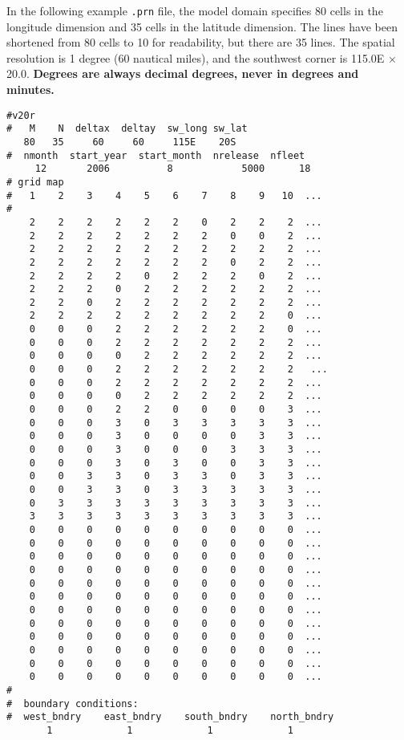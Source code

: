 \begin{description}
In the following example {\tt .prn} file, the model domain specifies
80 cells in the longitude dimension and 35 cells in the latitude
dimension. The lines have been shortened from 80 cells to 10 for
readability, but there are 35 lines. The spatial resolution is 1
degree (60 nautical miles), and the southwest corner is 115.0{E}
$\times$
20.0. {\bf Degrees are always decimal degrees, never in
degrees and minutes.}
{\par{}\normalbaselineskip
\begin{verbatim}
#v20r
#   M    N  deltax  deltay  sw_long sw_lat
   80   35     60     60     115E    20S
#  nmonth  start_year  start_month  nrelease  nfleet
     12       2006          8            5000      18
# grid map
#   1    2    3    4    5    6    7    8    9   10  ...
#
    2    2    2    2    2    2    0    2    2    2  ...
    2    2    2    2    2    2    2    0    0    2  ...
    2    2    2    2    2    2    2    2    2    2  ...
    2    2    2    2    2    2    2    0    2    2  ...
    2    2    2    2    0    2    2    2    0    2  ...
    2    2    2    0    2    2    2    2    2    2  ...
    2    2    0    2    2    2    2    2    2    2  ...
    2    2    2    2    2    2    2    2    2    0  ...
    0    0    0    2    2    2    2    2    2    0  ...
    0    0    0    2    2    2    2    2    2    2  ...
    0    0    0    0    2    2    2    2    2    2  ...
    0    0    0    2    2    2    2    2    2    2   ...
    0    0    0    2    2    2    2    2    2    2  ...
    0    0    0    0    2    2    2    2    2    2  ...
    0    0    0    2    2    0    0    0    0    3  ...
    0    0    0    3    0    3    3    3    3    3  ...
    0    0    0    3    0    0    0    0    3    3  ...
    0    0    0    3    0    0    0    3    3    3  ...
    0    0    0    3    0    3    0    0    3    3  ...
    0    0    3    3    0    3    3    0    3    3  ...
    0    0    3    3    0    3    3    3    3    3  ...
    0    3    3    3    3    3    3    3    3    3  ...
    3    3    3    3    3    3    3    3    3    3  ...
    0    0    0    0    0    0    0    0    0    0  ...
    0    0    0    0    0    0    0    0    0    0  ...
    0    0    0    0    0    0    0    0    0    0  ...
    0    0    0    0    0    0    0    0    0    0  ...
    0    0    0    0    0    0    0    0    0    0  ...
    0    0    0    0    0    0    0    0    0    0  ...
    0    0    0    0    0    0    0    0    0    0  ...
    0    0    0    0    0    0    0    0    0    0  ...
    0    0    0    0    0    0    0    0    0    0  ...
    0    0    0    0    0    0    0    0    0    0  ...
    0    0    0    0    0    0    0    0    0    0  ...
    0    0    0    0    0    0    0    0    0    0  ...
#
#  boundary conditions:
#  west_bndry    east_bndry    south_bndry    north_bndry
       1             1             1             1
\end{verbatim}
\par}


\end{description}
